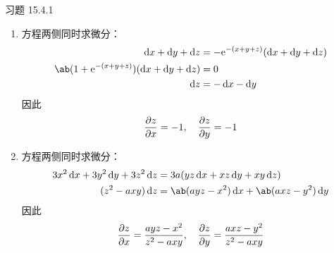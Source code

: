 \begin{problem}
    习题 15.4.1
    \begin{solution}
        \begin{enumerate}
            \item[\textbf{1)}] 方程两侧同时求微分：
            $$
            \begin{aligned}
                \dd{x} + \dd{y} + \dd{z} & = -\E^{-(x + y + z)} (\dd{x} + \dd{y} + \dd{z}) \\
                \ab(1 + \E^{-(x + y + z)}) (\dd{x} + \dd{y} + \dd{z}) & = 0 \\
                \dd{z} & = - \dd{x} - \dd{y}
            \end{aligned}
            $$
            因此
            $$
            \pdv{z}{x} = -1,\quad \pdv{z}{y} = -1
            $$

            \item[\textbf{2)}] 方程两侧同时求微分：
            $$
            \begin{aligned}
                3x^2 \dd{x} + 3y^2 \dd{y} + 3z^2 \dd{z} & = 3a(y z \dd{x} + x z \dd{y} + x y \dd{z}) \\
                (z^2 - a x y) \dd{z} & = \ab(a y z - x^2) \dd{x} + \ab(a x z - y^2) \dd{y}
            \end{aligned}
            $$
            因此
            $$
            \pdv{z}{x} = \frac{a y z - x^2}{z^2 - a x y},\quad \pdv{z}{y} = \frac{a x z - y^2}{z^2 - a x y}
            $$
        \end{enumerate}
    \end{solution}
\end{problem}

